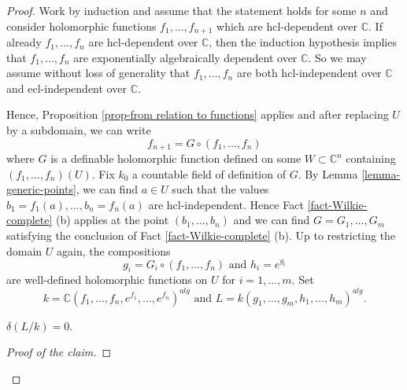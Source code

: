 \documentclass[10pt,a4paper]{amsart}
\begin{document}
\begin{proof} 
Work by induction and assume that the statement holds for some $n$ and consider holomorphic functions $f_1,\ldots,f_{n+1}$ which are $\mathrm{hcl}$-dependent over $\mathbb{C}$. If already $f_1,\ldots,f_n$ are $\mathrm{hcl}$-dependent over $\mathbb{C}$, then the induction hypothesis implies that $f_1,\ldots,f_{n}$ are exponentially algebraically dependent over $\mathbb{C}$. So we may assume without loss of generality that $f_1,\ldots,f_n$ are both $\mathrm{hcl}$-independent over $\mathbb{C}$ and $\mathrm{ecl}$-independent over $\mathbb{C}$. 

Hence, Proposition \ref{prop-from relation to functions} applies and after replacing $U$ by a subdomain, we can write 
\begin{equation}\label{equality-proof-equivalence} f_{n+1} = G \circ (f_1,\ldots,f_n) 
\end{equation}
where $G$ is a definable holomorphic function defined on some $W \subset \mathbb{C}^n$ containing $(f_1,\ldots,f_n)(U)$. Fix $k_0$ a countable field of definition of $G$. By Lemma \ref{lemma-generic-points}, we can find $a \in U$ such that the values $b_1 = f_1(a), ... , b_n = f_n(a)$ are $\mathrm{hcl}$-independent. Hence Fact \ref{fact-Wilkie-complete} (b) applies at the point $(b_1,\ldots,b_n)$ and we can find $G = G_1,\ldots,G_m$ satisfying the conclusion of Fact \ref{fact-Wilkie-complete} (b). Up to restricting the domain $U$ again, the compositions
$$g_i = G_i \circ (f_1,\ldots, f_n) \text{ and } h_i = e^{g_i}$$
are well-defined holomorphic functions on $U$ for $i =1,\ldots,m$. Set 
$$ k = \mathbb{C}(f_1,\ldots,f_n,e^{f_1},\ldots,e^{f_n})^{alg} \text{ and } L = k(g_1,\ldots,g_m, h_1,\ldots,h_m)^{alg}.$$

\begin{claim} 
$\delta(L/k) = 0.$
\end{claim} 


\begin{proof}[Proof of the claim]


\end{proof}
\end{proof}
\end{document}
